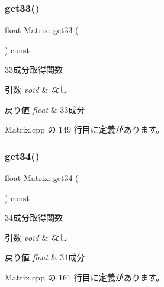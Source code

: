 \mbox{\label{class_matrix_a82d71b38d75c903207dc314262c910ad}} 
\subsubsection{\texorpdfstring{get33()}{get33()}}
{\footnotesize\ttfamily float Matrix\+::get33 (\begin{DoxyParamCaption}{ }\end{DoxyParamCaption}) const}



33成分取得関数 


\begin{DoxyParams}{引数}
{\em void} & なし \\
\hline
\end{DoxyParams}

\begin{DoxyRetVals}{戻り値}
{\em float} & 33成分 \\
\hline
\end{DoxyRetVals}


 Matrix.\+cpp の 149 行目に定義があります。

\mbox{\label{class_matrix_a544b0203b2d6656f45696f2c8f1af8cc}} 
\subsubsection{\texorpdfstring{get34()}{get34()}}
{\footnotesize\ttfamily float Matrix\+::get34 (\begin{DoxyParamCaption}{ }\end{DoxyParamCaption}) const}



34成分取得関数 


\begin{DoxyParams}{引数}
{\em void} & なし \\
\hline
\end{DoxyParams}

\begin{DoxyRetVals}{戻り値}
{\em float} & 34成分 \\
\hline
\end{DoxyRetVals}


 Matrix.\+cpp の 161 行目に定義があります。

\mbox{\label{class_matrix_a2afc1d50f54fc6f4a7088e4b6f016d84}} 
